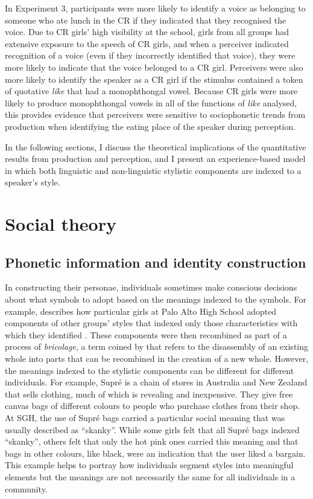 In Experiment 3, participants were more likely to identify a voice as belonging to someone who ate lunch in the CR if they indicated that they recognised the voice.  Due to CR girls' high visibility at the school, girls from all groups had extensive exposure to the speech of CR girls, and when a perceiver indicated recognition of a voice (even if they incorrectly identified that voice), they were more likely to indicate that the voice belonged to a CR girl.   Perceivers were also more likely to identify the speaker as a CR girl if the stimulus contained a token of quotative \textit{like} that had a monophthongal vowel.  Because CR girls were more likely to produce monophthongal vowels in all of the functions of \textit{like} analysed, this provides evidence that perceivers were sensitive to sociophonetic trends from production when identifying the eating place of the speaker during perception.

In the following sections, I discuss the theoretical implications of the quantitative results from production and perception, and I present an experience-based model in which both linguistic and non-linguistic stylistic components are indexed to a speaker's style.


\section{Social theory}

\subsection{Phonetic information and identity construction}

In constructing their personae, individuals sometimes make conscious decisions about what symbols to adopt based on the meanings indexed to the symbols.  For example, \citet{eckert2008} describes how particular girls at Palo Alto High School adopted components of other groups' styles that indexed only those characteristics with which they identified \citep[457]{eckert2008}.  These components were then recombined as part of a process of \textit{bricolage}, a term coined by \citet{levistrauss} that refers to the disassembly of an existing whole into parts that can be recombined in the creation of a new whole. However, the meanings indexed to the stylistic components can be different for different individuals.  For example, Supr\'{e} is a chain of stores in Australia and New Zealand that sells clothing, much of which is revealing and inexpensive.  They give free canvas bags of different colours to people who purchase clothes from their shop.  At SGH, the use of Supr\'{e} bags carried a particular social meaning that was usually described as ``skanky''.  While some girls felt that all Supr\'{e} bags indexed ``skanky'', others felt that only the hot pink ones carried this meaning and that bags in other colours, like black, were an indication that the user liked a bargain.  This example helps to portray how individuals segment styles into meaningful elements but the meanings are not necessarily the same for all individuals in a community.  

